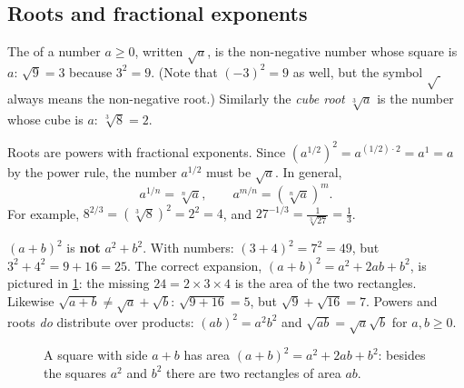 \subsection{Roots and fractional exponents}

The  of a number $a \ge 0$, written $\sqrt a$, is the
non-negative number whose square is $a$: $\sqrt{9} = 3$ because $3^2 = 9$.
(Note that $(-3)^2 = 9$ as well, but the symbol $\sqrt{\ }$ always means the
non-negative root.) Similarly the \emph{cube root} $\sqrt[3]{a}$ is the number
whose cube is $a$: $\sqrt[3]{8} = 2$.

Roots are powers with fractional exponents. Since
$(a^{1/2})^2 = a^{(1/2)\cdot 2} = a^1 = a$ by the power rule, the number
$a^{1/2}$ must be $\sqrt a$. In general,
\[
  a^{1/n} = \sqrt[n]{a}, \qquad a^{m/n} = \left(\sqrt[n]{a}\right)^m .
\]
For example, $8^{2/3} = (\sqrt[3]{8})^2 = 2^2 = 4$, and
$27^{-1/3} = \tfrac{1}{\sqrt[3]{27}} = \tfrac13$.

\begin{pitfall}
$(a + b)^2$ is \textbf{not} $a^2 + b^2$. With numbers:
$(3 + 4)^2 = 7^2 = 49$, but $3^2 + 4^2 = 9 + 16 = 25$. The correct expansion,
$(a+b)^2 = a^2 + 2ab + b^2$, is pictured in \cref{fig:square-of-sum}: the
missing $24 = 2\times 3\times 4$ is the area of the two rectangles. Likewise
$\sqrt{a + b} \neq \sqrt a + \sqrt b$: $\sqrt{9 + 16} = 5$, but
$\sqrt9 + \sqrt{16} = 7$. Powers and roots \emph{do} distribute over products:
$(ab)^2 = a^2b^2$ and $\sqrt{ab} = \sqrt a\sqrt b$ for $a, b \ge 0$.
\end{pitfall}

\begin{figure}[htbp]
\centering
{}
\caption{A square with side $a+b$ has area $(a+b)^2 = a^2 + 2ab + b^2$:
  besides the squares $a^2$ and $b^2$ there are two rectangles of area $ab$.}
\label{fig:square-of-sum}
\end{figure}

